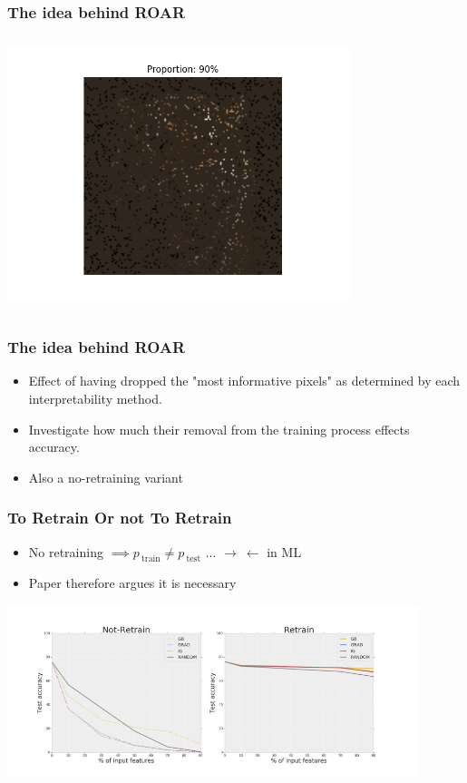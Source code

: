 \documentclass{beamer}
\theoremstyle{mystyle}
\begin{document}
\begin{frame}
	\frametitle{The idea behind ROAR}
	\includegraphics[height=8cm, width=10cm]{tiger0.9.png}

\end{frame}
\begin{frame}
	\frametitle{The idea behind ROAR}
	\begin{itemize}
		\item Effect of having dropped the "most informative pixels" as determined by each interpretability method.
		\item Investigate how much their removal from the training process effects accuracy.		
		\item Also a no-retraining variant
	\end{itemize}
\end{frame}
\begin{frame}
	\frametitle{To Retrain Or not To Retrain}
	\begin{itemize}
	\item No retraining  $\implies p_{\ \text{train}} \neq p_{ \ \text{test}}$ ... $\rightarrow \ \leftarrow$ in ML \pause
	\item Paper therefore argues it is necessary \pause
	\end{itemize}
	\includegraphics[width=12cm, height=5cm]{retrain_vs_not.png}
\end{frame}
\end{document}
